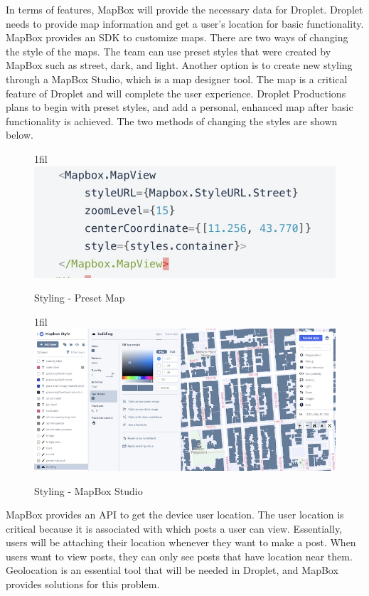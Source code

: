 \documentclass[draftclsnofoot, onecolumn, letterpaper,10pt,compsoc]{IEEEtran}
\makeatletter
\newcommand*{\centerfloat}{%
  \parindent \z@
  \leftskip \z@ \@plus 1fil \@minus \textwidth
  \rightskip\leftskip
  \parfillskip \z@skip}
\newcommand*{\centerfloat}{%
  \parindent \z@
  \leftskip \z@ \@plus 1fil \@minus \textwidth
  \rightskip\leftskip
  \parfillskip \z@skip}
\makeatother
\begin{document}
In terms of features, MapBox will provide the  necessary data for Droplet. \cite{mapboxreactnative} Droplet needs to provide map information and get a user's location for basic functionality. MapBox provides an SDK to customize maps. There are two ways of changing the style of the maps. The team can use preset styles that were created by MapBox such as street, dark, and light. \cite{mapboxreactnative} Another option is to create new styling through a MapBox Studio, which is a map designer tool. The map is a critical feature of Droplet and will complete the user experience. Droplet Productions plans to begin with preset styles, and add a personal, enhanced map after basic functionality is achieved. The two methods of changing the styles are shown below.
\begin{figure}[H]
    \centerfloat
    \includegraphics[scale=.3]{images/MapStyleExample.jpg}
    \caption{Styling - Preset Map}
    \label{fig:my_label}
\end{figure}
\begin{figure}[H]
    \centerfloat
    \includegraphics[scale=.3]{images/MapBoxStudio.jpg}
    \caption{Styling - MapBox Studio}
    \label{fig:my_label}
\end{figure}

MapBox provides an API to get the device user location. The user location is critical because it is associated with which posts a user can view. Essentially, users will be attaching their location whenever they want to make a post. When users want to view posts, they can only see posts that have location near them. Geolocation is an essential tool that will be needed in Droplet, and MapBox provides solutions for this problem.
\end{document}
